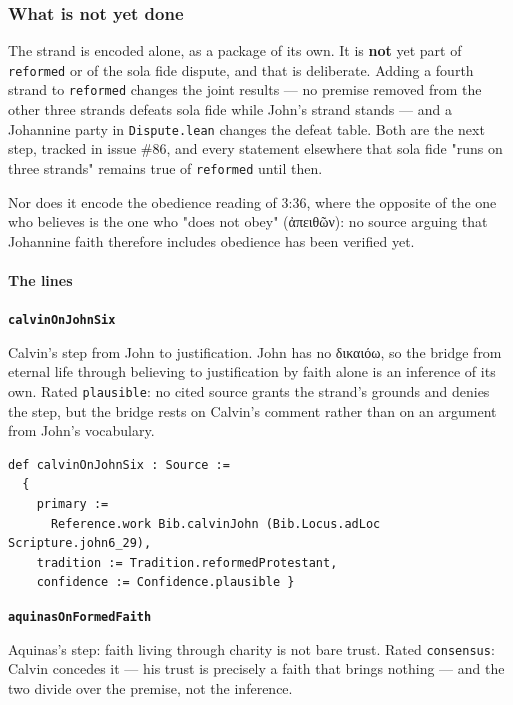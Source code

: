 \documentclass[11pt]{article}
\begin{document}
\subsubsection*{What is not yet done}
The strand is encoded alone, as a package of its own. It is \textbf{not} yet part of \texttt{reformed} or of the sola fide dispute, and that is deliberate. Adding a fourth strand to \texttt{reformed} changes the joint results — no premise removed from the other three strands defeats sola fide while John's strand stands — and a Johannine party in \texttt{Dispute.lean} changes the defeat table. Both are the next step, tracked in issue \#86, and every statement elsewhere that sola fide "runs on three strands" remains true of \texttt{reformed} until then.

Nor does it encode the obedience reading of 3:36, where the opposite of the one who believes is the one who "does not obey" (ἀπειθῶν): no source arguing that Johannine faith therefore includes obedience has been verified yet.

\paragraph*{The lines}
\leavevmode\par
\par\medskip\noindent\textbf{\texttt{calvin\allowbreak{}On\allowbreak{}John\allowbreak{}Six}}\par\nobreak\noindent
Calvin's step from John to justification. John has no δικαιόω, so the bridge from eternal life through believing to justification by faith alone is an inference of its own. Rated \texttt{plausible}: no cited source grants the strand's grounds and denies the step, but the bridge rests on Calvin's comment rather than on an argument from John's vocabulary.

{\small\begin{verbatim}
def calvinOnJohnSix : Source :=
  {
    primary :=
      Reference.work Bib.calvinJohn (Bib.Locus.adLoc Scripture.john6_29),
    tradition := Tradition.reformedProtestant,
    confidence := Confidence.plausible }
\end{verbatim}}
\par\medskip\noindent\textbf{\texttt{aquinas\allowbreak{}On\allowbreak{}Formed\allowbreak{}Faith}}\par\nobreak\noindent
Aquinas's step: faith living through charity is not bare trust. Rated \texttt{consensus}: Calvin concedes it — his trust is precisely a faith that brings nothing — and the two divide over the premise, not the inference.
\end{document}
